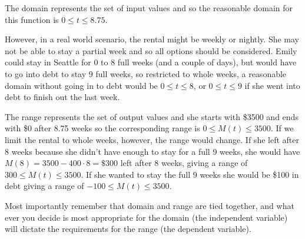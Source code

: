 \begin{example}
\begin{solution}
The domain represents the set of input values and so the reasonable domain for this function is $0\le t\le 8.75$.

However, in a real world scenario, the rental might be weekly or nightly. She may not be able to stay a partial week and so all options should be considered. Emily could stay in Seattle for 0 to 8 full weeks (and a couple of days), but would have to go into debt to stay 9 full weeks, so restricted to whole weeks, a reasonable domain without going
in to debt would be $0\le t\le 8$, or $0\le t\le 9$ if she went into debt to finish out the last week.

The range represents the set of output values and she starts with \$3500 and ends with \$0 after 8.75 weeks so the corresponding range is $0\le M(t)\le 3500$. If we limit the rental to whole weeks, however, the range would change. If she left after 8 weeks because she didn't have enough to stay for a full 9 weeks, she would have $M(8) = 3500-400\cdot 8 = \$300$ left after 8 weeks, giving a range of $300\le M(t)\le 3500$. If she wanted to stay the full 9 weeks she would be \$100 in debt giving a range of $-100\le M(t)\le 3500$.
\end{solution}\end{example}

Most importantly remember that domain and range are tied together, and what ever you decide is most appropriate for the domain (the independent variable) will dictate the requirements for the range (the dependent variable).

